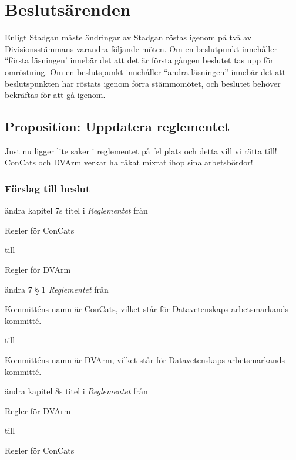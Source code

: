 \documentclass[protokoll]{dvd}
\begin{document}
\newpage

\section{Beslutsärenden}

Enligt Stadgan måste ändringar av Stadgan röstas igenom på två av Divisionsstämmans varandra följande möten.
Om en beslutpunkt innehåller ``första läsningen' innebär det att det är första gången beslutet tas upp för omröstning.
Om en beslutspunkt innehåller ``andra läsningen'' innebär det att beslutspunkten har röstats igenom förra stämmomötet, och beslutet behöver bekräftas för att gå igenom.

\subsection{Proposition: Uppdatera reglementet}
Just nu ligger lite saker i reglementet på fel plats och detta vill vi rätta till!
ConCats och DVArm verkar ha råkat mixrat ihop sina arbetsbördor!

\subsubsection*{Förslag till beslut}
\begin{attsatser}
    \item ändra kapitel 7s titel i \emph{Reglementet} från
    \begin{displayquote}Regler för ConCats\end{displayquote}
    till
    \begin{displayquote}Regler för DVArm\end{displayquote}

    \item ändra 7 § 1 \emph{Reglementet} från
    \begin{displayquote}
        Kommitténs namn är ConCats, vilket står för Datavetenskaps arbetsmarkands-kommitté.
    \end{displayquote}
    till
    \begin{displayquote}
        Kommitténs namn är DVArm, vilket står för Datavetenskaps arbetsmarkands-kommitté.
    \end{displayquote}

    \item ändra kapitel 8s titel i \emph{Reglementet} från
    \begin{displayquote}Regler för DVArm\end{displayquote}
    till
    \begin{displayquote}Regler för ConCats\end{displayquote}

\end{attsatser}
\end{document}
